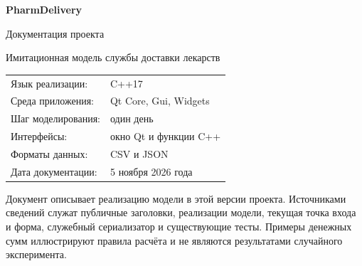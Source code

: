 \documentclass[11pt,a4paper]{article}
\begin{document}
\begin{titlepage}
  \centering
  \vspace*{25mm}
  {\Huge\sffamily\bfseries\color{accent} PharmDelivery\par}
  \vspace{8mm}
  {\LARGE Документация проекта\par}
  \vspace{6mm}
  {\large Имитационная модель службы доставки лекарств\par}
  \vspace{18mm}
  \begin{tabular}{ll}
    Язык реализации: & C++17 \\
    Среда приложения: & Qt Core, Gui, Widgets \\
    Шаг моделирования: & один день \\
    Интерфейсы: & окно Qt и функции C++ \\
    Форматы данных: & CSV и JSON \\
    Дата документации: & 5 ноября 2026 года
  \end{tabular}
  \vfill
  \begin{minipage}{0.9\textwidth}
    Документ описывает реализацию модели в этой версии проекта.
    Источниками сведений служат публичные заголовки, реализации модели,
    текущая точка входа и форма, служебный сериализатор
    и существующие тесты. Примеры денежных сумм иллюстрируют правила расчёта
    и не являются результатами случайного эксперимента.
  \end{minipage}
\end{titlepage}

\tableofcontents
\clearpage







\clearpage

\end{document}

